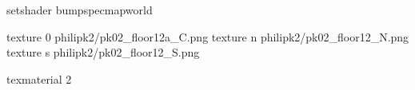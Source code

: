 setshader bumpspecmapworld

texture 0 philipk2/pk02_floor12a_C.png
texture n philipk2/pk02_floor12_N.png
texture s philipk2/pk02_floor12_S.png

texmaterial 2
